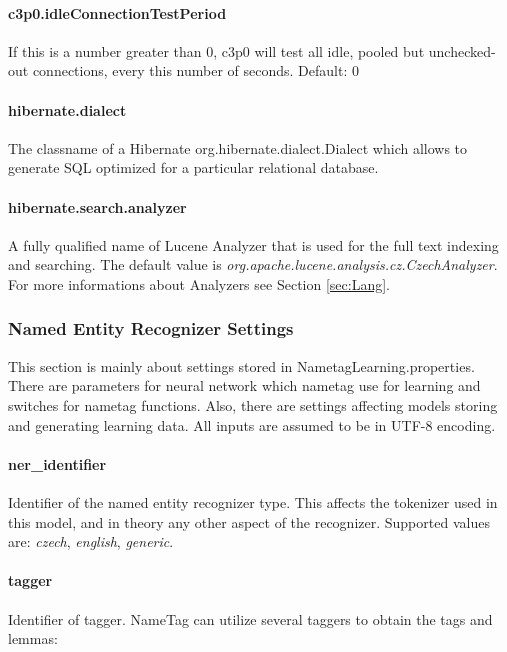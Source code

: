 \paragraph{c3p0.idleConnectionTestPeriod}
If this is a number greater than 0, c3p0 will test all idle, pooled but unchecked-out
connections, every this number of seconds.
Default: 0

\paragraph{hibernate.dialect}
The classname of a Hibernate org.hibernate.dialect.Dialect which allows to generate
SQL optimized for a particular relational database.

\paragraph{hibernate.search.analyzer}
A fully qualified name of Lucene Analyzer that is used for the full text indexing
and searching. The default value is \emph{org.\-apache.\-lucene.\-analysis.\-cz.\-CzechAnalyzer}.
For more informations about Analyzers see Section \ref{sec:Lang}.

\subsubsection{Named Entity Recognizer Settings}
\label{sssec:NametagSettings}
This section is mainly about settings stored in NametagLearning.properties. There
are parameters for neural network which nametag use for learning and switches for
nametag functions. Also, there are settings affecting models storing and
generating learning data. All inputs are assumed to be in UTF-8 encoding.

\paragraph{ner\_identifier}
Identifier of the named entity recognizer type. This affects the tokenizer used
in this model, and in theory any other aspect of the recognizer. Supported values
are: \emph{czech}, \emph{english}, \emph{generic}.

\paragraph{tagger}
Identifier of tagger. NameTag can utilize several taggers to obtain the tags and lemmas:

